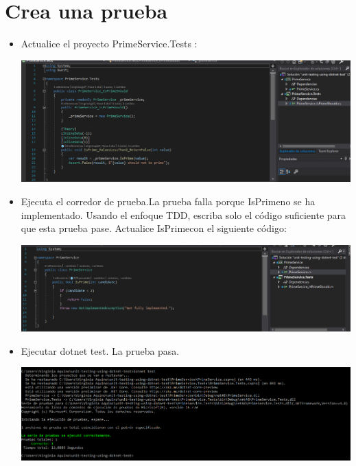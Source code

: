 \section{Crea una prueba } 
\begin{itemize}

\item Actualice el proyecto PrimeService.Tests :

\begin{center}
\includegraphics[width=\columnwidth]{images/lab3}\newline
\end{center} 
\item Ejecuta el corredor de prueba.La prueba falla porque IsPrimeno se ha implementado. Usando el enfoque TDD, escriba
solo el código suficiente para que esta prueba pase. Actualice IsPrimecon el siguiente
código:
\begin{center}
\includegraphics[width=\columnwidth]{images/lab4}\newline
\end{center} 
\item Ejecutar dotnet test. La prueba pasa.
\begin{center}
\includegraphics[width=\columnwidth]{images/resultado2}\newline

\end{center}
\end{itemize}
